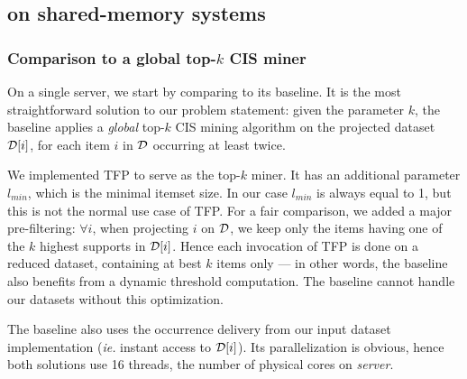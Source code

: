 \subsection{\toppi on shared-memory systems}
\label{sec:toppi:xp:server}


\subsubsection{Comparison to a global top-$k$ CIS miner}

On a single server, we start by  comparing \toppi to its baseline.
It is the most straightforward solution to our problem statement:
given the parameter $k$,
the baseline applies a \emph{global} top-$k$ CIS mining algorithm on the projected dataset ${\cal D}[i]$,
for each item $i$ in ${\cal D}$ occurring at least twice.

We implemented TFP\cite{HanICDM02,WangTKDE05} to serve as the top-$k$ miner.
It has an additional parameter $l_{min}$, which is the minimal itemset size.
In our case $l_{min}$ is always equal to 1, but this is not the normal use case of TFP.
For a fair comparison, we added a major pre-filtering:
$\forall i$, when projecting $i$ on ${\cal D}$,
we keep only the items having one of the $k$ highest supports in ${\cal D}[i]$.
Hence each invocation of TFP is done on a reduced dataset, containing at best $k$ items only ---
in other words, the baseline also benefits from a dynamic threshold computation.
The baseline cannot handle our datasets without this optimization.

The baseline also uses the occurrence delivery from our input dataset implementation
({\em ie.} instant access to ${\cal D}[i]$).
Its parallelization is obvious,
hence both solutions use 16 threads, the number of physical cores on \emph{server}.

